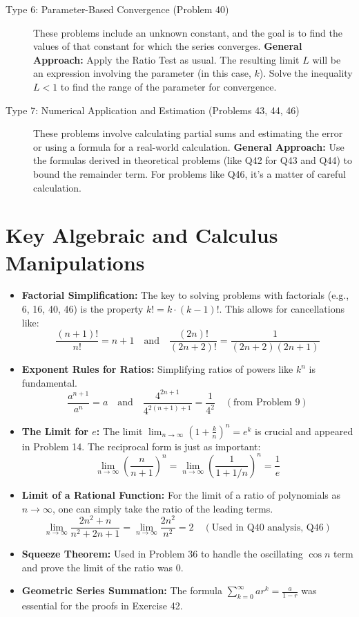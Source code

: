 \documentclass{article}
\begin{document}
\begin{description}
    \item[Type 6: Parameter-Based Convergence (Problem 40)]
    These problems include an unknown constant, and the goal is to find the values of that constant for which the series converges.
    \textbf{General Approach:} Apply the Ratio Test as usual. The resulting limit $L$ will be an expression involving the parameter (in this case, $k$). Solve the inequality $L<1$ to find the range of the parameter for convergence.

    \item[Type 7: Numerical Application and Estimation (Problems 43, 44, 46)]
    These problems involve calculating partial sums and estimating the error or using a formula for a real-world calculation.
    \textbf{General Approach:} Use the formulas derived in theoretical problems (like Q42 for Q43 and Q44) to bound the remainder term. For problems like Q46, it's a matter of careful calculation.
\end{description}

\section{Key Algebraic and Calculus Manipulations}
\begin{itemize}
    \item \textbf{Factorial Simplification:} The key to solving problems with factorials (e.g., 6, 16, 40, 46) is the property $k! = k \cdot (k-1)!$. This allows for cancellations like:
    \[ \frac{(n+1)!}{n!} = n+1 \quad \text{and} \quad \frac{(2n)!}{(2n+2)!} = \frac{1}{(2n+2)(2n+1)} \]
    \item \textbf{Exponent Rules for Ratios:} Simplifying ratios of powers like $k^n$ is fundamental.
    \[ \frac{a^{n+1}}{a^n} = a \quad \text{and} \quad \frac{4^{2n+1}}{4^{2(n+1)+1}} = \frac{1}{4^2} \quad (\text{from Problem 9}) \]
    \item \textbf{The Limit for $e$:} The limit $\lim_{n \to \infty} (1 + \frac{k}{n})^n = e^k$ is crucial and appeared in Problem 14. The reciprocal form is just as important:
    \[ \lim_{n \to \infty} \left(\frac{n}{n+1}\right)^n = \lim_{n \to \infty} \left(\frac{1}{1 + 1/n}\right)^n = \frac{1}{e} \]
    \item \textbf{Limit of a Rational Function:} For the limit of a ratio of polynomials as $n \to \infty$, one can simply take the ratio of the leading terms.
    \[ \lim_{n \to \infty} \frac{2n^2+n}{n^2+2n+1} = \lim_{n \to \infty} \frac{2n^2}{n^2} = 2 \quad (\text{Used in Q40 analysis, Q46}) \]
    \item \textbf{Squeeze Theorem:} Used in Problem 36 to handle the oscillating $\cos n$ term and prove the limit of the ratio was 0.
    \item \textbf{Geometric Series Summation:} The formula $\sum_{k=0}^\infty ar^k = \frac{a}{1-r}$ was essential for the proofs in Exercise 42.
\end{itemize}
\end{document}
